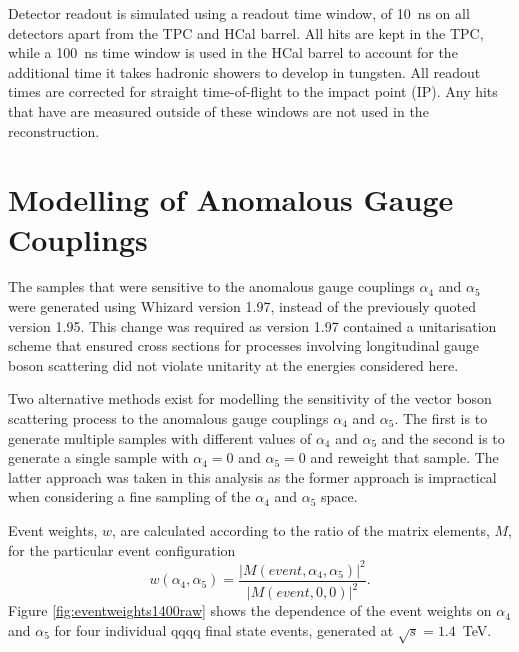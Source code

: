 Detector readout is simulated using a readout time window, of 10~ns on all detectors apart from the TPC and HCal barrel.  All hits are kept in the TPC, while a 100~ns time window is used in the HCal barrel to account for the additional time it takes hadronic showers to develop in tungsten.  All readout times are corrected for straight time-of-flight to the impact point (IP).  Any hits that have are measured outside of these windows are not used in the reconstruction.   
 

\section{Modelling of Anomalous Gauge Couplings}
\label{sec:modellingofanomalouscouplings}
The samples that were sensitive to the anomalous gauge couplings $\alpha_{4}$ and $\alpha_{5}$ were generated using Whizard version 1.97, instead of the previously quoted version 1.95.  This change was required as version 1.97 contained a unitarisation scheme that ensured cross sections for processes involving longitudinal gauge boson scattering did not violate unitarity at the energies considered here.  

Two alternative methods exist for modelling the sensitivity of the vector boson scattering process to the anomalous gauge couplings $\alpha_{4}$ and $\alpha_{5}$.  The first is to generate multiple samples with different values of $\alpha_{4}$ and $\alpha_{5}$ and the second is to generate a single sample with $\alpha_{4} = 0$ and $\alpha_{5} = 0$ and reweight that sample.  The latter approach was taken in this analysis as the former approach is impractical when considering a fine sampling of the $\alpha_{4}$ and $\alpha_{5}$ space.

Event weights, $w$, are calculated according to the ratio of the matrix elements, $M$, for the particular event configuration \cite{WhizardManual}
%
\begin{equation}
w(\alpha_{4},\alpha_{5}) = \frac{|M(event,\alpha_{4},\alpha_{5})|^{2}}{|M(event,0,0)|^{2}} \text{.}
\end{equation}
%
Figure \ref{fig:eventweights1400raw} shows the dependence of the event weights on $\alpha_{4}$ and $\alpha_{5}$ for four individual \nu{\nu}qqqq final state events, generated at $\sqrt{s}=1.4$~TeV.

